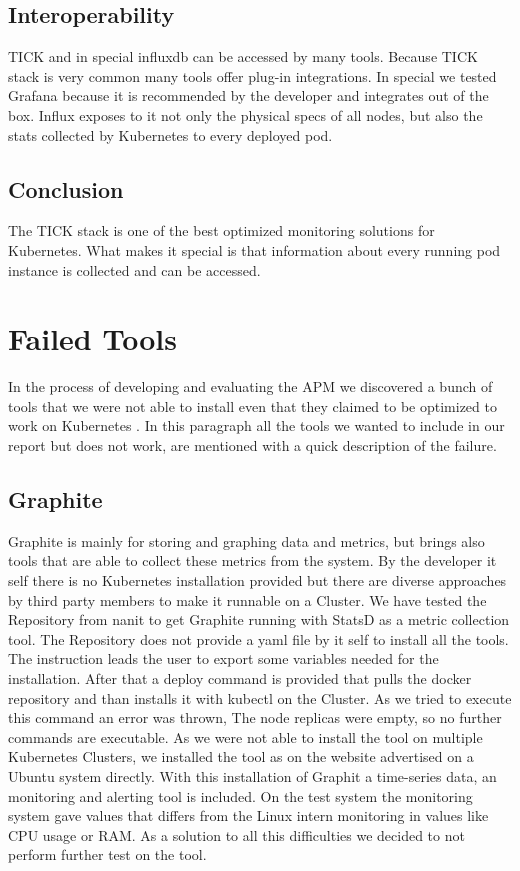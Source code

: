 \subsection{Interoperability}
TICK and in special influxdb can be accessed by many tools. Because TICK stack is very common many tools offer plug-in integrations. In special we tested Grafana because it is recommended by the developer and integrates out of the box. Influx exposes to it not only the physical specs of all nodes, but also the stats collected by Kubernetes to every deployed pod. 
\subsection{Conclusion}
The TICK stack is one of the best optimized monitoring solutions for Kubernetes. What makes it special is that information about every running pod instance is collected and can be accessed.



\section{Failed Tools}%
In the process of developing and evaluating the APM we discovered a bunch of tools that we were not able to install even that they claimed to be optimized to work on Kubernetes .
In this paragraph all the tools we wanted to include in our report but does not work, are mentioned with a quick description of the failure.
\subsection{Graphite}
Graphite is mainly for storing and graphing data and metrics, but brings also tools that are able to collect these metrics from the system. By the developer it self there is no Kubernetes installation provided but there are diverse approaches by third party members to make it runnable on a Cluster. We have tested the Repository from nanit \cite{graphite} to get Graphite running with StatsD \cite{statsd} as a metric collection tool. The Repository does not provide a yaml file by it self to install all the tools. The instruction leads the user to export some variables needed for the installation. After that a deploy command is provided that pulls the docker repository and than installs it with kubectl on the Cluster. As we tried to execute this command an error was thrown, The node replicas were empty, so no further commands are executable. As we were not able to install the tool on multiple Kubernetes Clusters, we installed the tool as on the website advertised on a Ubuntu system directly. With this installation of Graphit a time-series data, an monitoring and alerting tool is included. On the test system the monitoring system gave values that differs from the Linux intern monitoring in values like CPU usage or RAM. As a solution to all this difficulties we decided to not perform further test on the tool.

